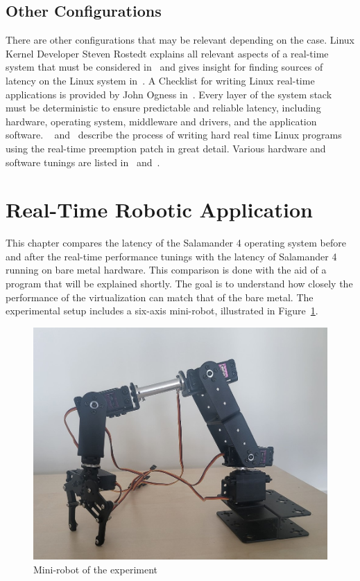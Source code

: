 \documentclass[MMR,Master,english]{twbook}
\begin{document}
\subsection{Other Configurations}
There are other configurations that may be relevant depending on the case. Linux Kernel Developer Steven Rostedt explains all relevant aspects of a real-time system that must be considered in~\cite{kernelrecipesKernelRecipes20162016} and gives insight for finding sources of latency on the Linux system in~\cite{thelinuxfoundationFindingSourcesLatency2020}. A Checklist for writing Linux real-time applications is provided by John Ogness in~\cite{thelinuxfoundationChecklistWritingLinux2020}. Every layer of the system stack must be deterministic to ensure predictable and reliable latency, including hardware, operating system, middleware and drivers, and the application software. ~\cite{HOWTOBuildRTapplication} and~\cite{RealtimeProgrammingLinux} describe the process of writing hard real time Linux programs using the real-time preemption patch in great detail. Various hardware and software tunings are listed in~\cite{KVMQemuVirtualization} and~\cite{RealTimePerformanceTuning2022}.

\clearpage

\section{Real-Time Robotic Application}\label{sec:robotic_application}
This chapter compares the latency of the Salamander 4 operating system before and after the real-time performance tunings with the latency of Salamander 4 running on bare metal hardware. This comparison is done with the aid of a program that will be explained shortly. The goal is to understand how closely the performance of the virtualization can match that of the bare metal. The experimental setup includes a six-axis mini-robot, illustrated in Figure~\ref{fig:mini_robot}.

\begin{figure}[H]
	\centering
	\includegraphics[width=0.45\columnwidth]{img/experiment/mini_robot.jpg}
	\caption[Mini-robot of the experiment]{Mini-robot of the experiment}
	\label{fig:mini_robot}
\end{figure}
\end{document}
